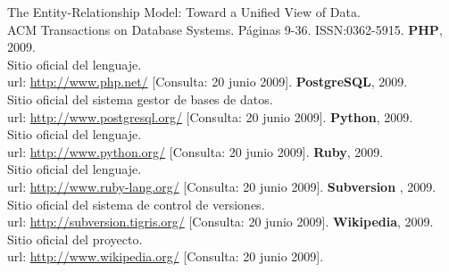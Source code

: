 \begin{thebibliography}{xx}
         The Entity-Relationship Model: Toward a Unified View of Data. \\
         ACM Transactions on Database Systems. Páginas 9-36.
         ISSN:0362-5915.
 \textbf{PHP}, 2009.\\
         Sitio oficial del lenguaje.\\
         url: \url{http://www.php.net/}
         [Consulta: 20 junio 2009].
 \textbf{PostgreSQL}, 2009.\\
         Sitio oficial del sistema gestor de bases de datos.\\
         url: \url{http://www.postgresql.org/}
         [Consulta: 20 junio 2009].
 \textbf{Python}, 2009.\\
         Sitio oficial del lenguaje.\\
         url: \url{http://www.python.org/}
         [Consulta: 20 junio 2009].
 \textbf{Ruby}, 2009.\\
         Sitio oficial del lenguaje.\\
         url: \url{http://www.ruby-lang.org/}
         [Consulta: 20 junio 2009].
 \textbf{Subversion} , 2009.\\
         Sitio oficial del sistema de control de versiones.\\
         url: \url{http://subversion.tigris.org/}
         [Consulta: 20 junio 2009].
 \textbf{Wikipedia}, 2009.\\
         Sitio oficial del proyecto.\\
         url: \url{http://www.wikipedia.org/}
         [Consulta: 20 junio 2009].
 \end{thebibliography}